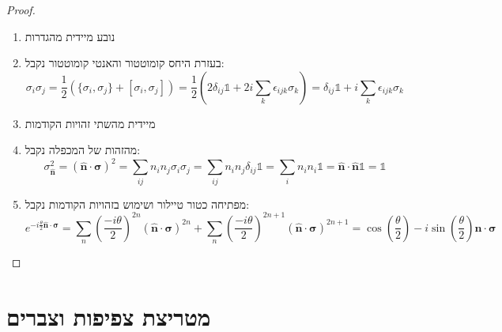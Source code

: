 \documentclass{tstextbook}
\begin{document}
\begin{proof}
  \begin{enumerate}
    \item נובע מיידית מהגדרות 


    \item בעזרת היחס קומוטטור והאנטי קומוטטור נקבל: 
$$\sigma_{i}\sigma_{j}={\frac{1}{2}}\left(\{\sigma_{i},\sigma_{j}\}+[\sigma_{i},\sigma_{j}]\right)={\frac{1}{2}}\left(2\delta_{i j}\mathbb{1}+2i{\underset{k}{\sum}}\epsilon_{i j k}\sigma_{k}\right)=\delta_{i j}\mathbb{1}+i{\underset{k}{\sum}}\epsilon_{i j k}\sigma_{k}$$


    \item מיידית מהשתי זהויות הקודמות 


    \item מהזהות של המכפלה נקבל: 
$$\sigma_{\mathbf{\hat{n}}}^{2}=\left({\hat{\mathbf{n}}}\cdot\boldsymbol\sigma\right)^{2}=\sum_{i j}n_{i}n_{j}\sigma_{i}\sigma_{j}=\sum_{i j}n_{i}n_{j}\delta_{i j}\mathbb{1}=\sum_{i}n_{i}n_{i}\mathbb{1}={\hat{\mathbf{n}}}\cdot{\hat{\mathbf{n}}}\mathbb{1}=\mathbb{1}$$


    \item מפתיחה כטור טיילור ושימוש בזהויות הקודמות נקבל: 
$$e^{-i{\frac{\theta}{2}}{\hat{\mathbf{n}}}\cdot\boldsymbol\sigma}=\sum_{n}\left({\frac{-i\theta}{2}}\right)^{2n}({\hat{\mathbf{n}}}\cdot\boldsymbol\sigma)^{2n}+\sum_{n}\left({\frac{-i\theta}{2}}\right)^{2n+1}({\hat{\mathbf{n}}}\cdot\boldsymbol\sigma)^{2n+1}=\cos\left({\frac{\theta}{2}}\right)-i\sin\left({\frac{\theta}{2}}\right){\hat{\mathbf{n}}}\cdot\boldsymbol\sigma$$


  \end{enumerate}
\end{proof}
\section{מטריצת צפיפות וצברים}
\end{document}
